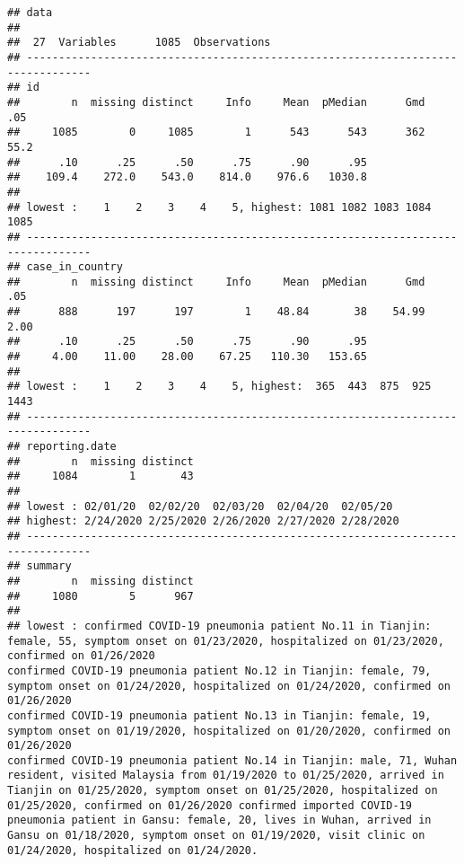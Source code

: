 \documentclass[
]{article}
\begin{document}
\begin{verbatim}
## data 
## 
##  27  Variables      1085  Observations
## --------------------------------------------------------------------------------
## id 
##        n  missing distinct     Info     Mean  pMedian      Gmd      .05 
##     1085        0     1085        1      543      543      362     55.2 
##      .10      .25      .50      .75      .90      .95 
##    109.4    272.0    543.0    814.0    976.6   1030.8 
## 
## lowest :    1    2    3    4    5, highest: 1081 1082 1083 1084 1085
## --------------------------------------------------------------------------------
## case_in_country 
##        n  missing distinct     Info     Mean  pMedian      Gmd      .05 
##      888      197      197        1    48.84       38    54.99     2.00 
##      .10      .25      .50      .75      .90      .95 
##     4.00    11.00    28.00    67.25   110.30   153.65 
## 
## lowest :    1    2    3    4    5, highest:  365  443  875  925 1443
## --------------------------------------------------------------------------------
## reporting.date 
##        n  missing distinct 
##     1084        1       43 
## 
## lowest : 02/01/20  02/02/20  02/03/20  02/04/20  02/05/20 
## highest: 2/24/2020 2/25/2020 2/26/2020 2/27/2020 2/28/2020
## --------------------------------------------------------------------------------
## summary 
##        n  missing distinct 
##     1080        5      967 
## 
## lowest : confirmed COVID-19 pneumonia patient No.11 in Tianjin: female, 55, symptom onset on 01/23/2020, hospitalized on 01/23/2020, confirmed on 01/26/2020                                                                                                 confirmed COVID-19 pneumonia patient No.12 in Tianjin: female, 79, symptom onset on 01/24/2020, hospitalized on 01/24/2020, confirmed on 01/26/2020                                                                                                 confirmed COVID-19 pneumonia patient No.13 in Tianjin: female, 19, symptom onset on 01/19/2020, hospitalized on 01/20/2020, confirmed on 01/26/2020                                                                                                 confirmed COVID-19 pneumonia patient No.14 in Tianjin: male, 71, Wuhan resident, visited Malaysia from 01/19/2020 to 01/25/2020, arrived in Tianjin on 01/25/2020, symptom onset on 01/25/2020, hospitalized on 01/25/2020, confirmed on 01/26/2020 confirmed imported COVID-19 pneumonia patient in Gansu: female, 20, lives in Wuhan, arrived in Gansu on 01/18/2020, symptom onset on 01/19/2020, visit clinic on 01/24/2020, hospitalized on 01/24/2020.                                           

\end{verbatim}
\end{document}
